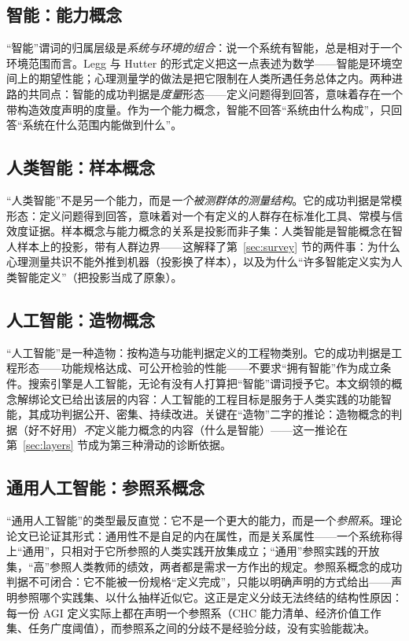 \documentclass[10pt,fontset=fandol]{ctexart}
\begin{document}
\subsection{智能：能力概念}

“智能”谓词的归属层级是\emph{系统与环境的组合}：说一个系统有智能，总是相对于一个环境范围而言。Legg 与 Hutter 的形式定义把这一点表述为数学——智能是环境空间上的期望性能\cite{legg2007universal}；心理测量学的做法是把它限制在人类所遇任务总体之内。两种进路的共同点：智能的成功判据是\emph{度量}形态——定义问题得到回答，意味着存在一个带构造效度声明的度量。作为一个能力概念，智能不回答“系统由什么构成”，只回答“系统在什么范围内能做到什么”。

\subsection{人类智能：样本概念}

“人类智能”不是另一个能力，而是\emph{一个被测群体的测量结构}。它的成功判据是常模形态：定义问题得到回答，意味着对一个有定义的人群存在标准化工具、常模与信效度证据\cite{spearman1904general,mcgrew2023chc,neisser1996intelligence}。样本概念与能力概念的关系是投影而非子集：人类智能是智能概念在智人样本上的投影，带有人群边界——这解释了第~\ref{sec:survey} 节的两件事：为什么心理测量共识不能外推到机器（投影换了样本）\cite{hernandezorallo2017measure}，以及为什么“许多智能定义实为人类智能定义”（把投影当成了原象）。

\subsection{人工智能：造物概念}

“人工智能”是一种造物：按构造与功能判据定义的工程物类别。它的成功判据是工程形态——功能规格达成、可公开检验的性能——不要求“拥有智能”作为成立条件。搜索引擎是人工智能，无论有没有人打算把“智能”谓词授予它。本文纲领的概念解绑论文已给出该层的内容：人工智能的工程目标是服务于人类实践的功能智能，其成功判据公开、密集、持续改进\cite{yu2026twogoals}。关键在“造物”二字的推论：造物概念的判据（好不好用）\emph{不}定义能力概念的内容（什么是智能）——这一推论在第~\ref{sec:layers} 节成为第三种滑动的诊断依据。

\subsection{通用人工智能：参照系概念}

“通用人工智能”的类型最反直觉：它不是一个更大的能力，而是一个\emph{参照系}。理论论文已论证其形式：通用性不是自足的内在属性，而是关系属性——一个系统称得上“通用”，只相对于它所参照的人类实践开放集成立；“通用”参照实践的开放集，“高”参照人类教师的绩效，两者都是需求一方作出的规定\cite{yu2026theory}。参照系概念的成功判据不可闭合：它不能被一份规格“定义完成”，只能以明确声明的方式给出——声明参照哪个实践集、以什么抽样近似它。这正是定义分歧无法终结的结构性原因：每一份 AGI 定义实际上都在声明一个参照系（CHC 能力清单\cite{hendrycks2025definition}、经济价值工作集\cite{openai2018charter}、任务广度阈值\cite{morris2023levels}），而参照系之间的分歧不是经验分歧，没有实验能裁决。
\end{document}
